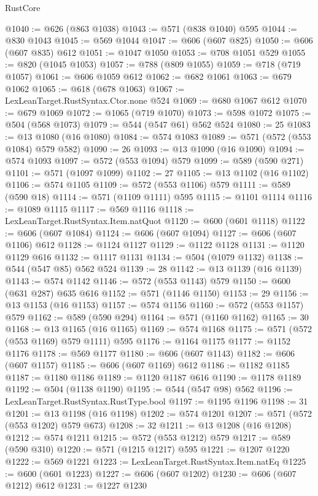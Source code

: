 \begin{lexlean}{RustCore}
\begin{coremodule}
@1040 := @626 (@863 @1038)
@1043 := @571 (@838 @1040) @595
@1044 := @830 @1043
@1045 := @569 @1044
@1047 := @606 (@607 @825)
@1050 := @606 (@607 @835) @612
@1051 := @1047 @1050
@1053 := @708 @1051 @529
@1055 := @820 (@1045 @1053)
@1057 := @788 (@809 @1055)
@1059 := @718 (@719 @1057)
@1061 := @606 @1059 @612
@1062 := @682 @1061
@1063 := @679 @1062
@1065 := @618 (@678 @1063)
@1067 := LexLeanTarget.RustSyntax.Ctor.none @524
@1069 := @680 @1067 @612
@1070 := @679 @1069
@1072 := @1065 (@719 @1070)
@1073 := @598 @1072
@1075 := @504 (@568 @1073)
@1079 := @544 (@547 @61) @562 @524
@1080 := 25
@1083 := @13 @1080 (@16 @1080)
@1084 := @574 @1083
@1089 := @571 (@572 (@553 @1084) @579 @582)
@1090 := 26
@1093 := @13 @1090 (@16 @1090)
@1094 := @574 @1093
@1097 := @572 (@553 @1094) @579
@1099 := @589 (@590 @271)
@1101 := @571 (@1097 @1099)
@1102 := 27
@1105 := @13 @1102 (@16 @1102)
@1106 := @574 @1105
@1109 := @572 (@553 @1106) @579
@1111 := @589 (@590 @18)
@1114 := @571 (@1109 @1111) @595
@1115 := @1101 @1114
@1116 := @1089 @1115
@1117 := @569 @1116
@1118 := LexLeanTarget.RustSyntax.Item.natQuot
@1120 := @600 (@601 @1118)
@1122 := @606 (@607 @1084)
@1124 := @606 (@607 @1094)
@1127 := @606 (@607 @1106) @612
@1128 := @1124 @1127
@1129 := @1122 @1128
@1131 := @1120 @1129 @616
@1132 := @1117 @1131
@1134 := @504 (@1079 @1132)
@1138 := @544 (@547 @85) @562 @524
@1139 := 28
@1142 := @13 @1139 (@16 @1139)
@1143 := @574 @1142
@1146 := @572 (@553 @1143) @579
@1150 := @600 (@631 @287) @635 @616
@1152 := @571 (@1146 @1150)
@1153 := 29
@1156 := @13 @1153 (@16 @1153)
@1157 := @574 @1156
@1160 := @572 (@553 @1157) @579
@1162 := @589 (@590 @294)
@1164 := @571 (@1160 @1162)
@1165 := 30
@1168 := @13 @1165 (@16 @1165)
@1169 := @574 @1168
@1175 := @571 (@572 (@553 @1169) @579 @1111) @595
@1176 := @1164 @1175
@1177 := @1152 @1176
@1178 := @569 @1177
@1180 := @606 (@607 @1143)
@1182 := @606 (@607 @1157)
@1185 := @606 (@607 @1169) @612
@1186 := @1182 @1185
@1187 := @1180 @1186
@1189 := @1120 @1187 @616
@1190 := @1178 @1189
@1192 := @504 (@1138 @1190)
@1195 := @544 (@547 @98) @562
@1196 := LexLeanTarget.RustSyntax.RustType.bool
@1197 := @1195 @1196
@1198 := 31
@1201 := @13 @1198 (@16 @1198)
@1202 := @574 @1201
@1207 := @571 (@572 (@553 @1202) @579 @673)
@1208 := 32
@1211 := @13 @1208 (@16 @1208)
@1212 := @574 @1211
@1215 := @572 (@553 @1212) @579
@1217 := @589 (@590 @310)
@1220 := @571 (@1215 @1217) @595
@1221 := @1207 @1220
@1222 := @569 @1221
@1223 := LexLeanTarget.RustSyntax.Item.natEq
@1225 := @600 (@601 @1223)
@1227 := @606 (@607 @1202)
@1230 := @606 (@607 @1212) @612
@1231 := @1227 @1230

\end{coremodule}
\end{lexlean}
